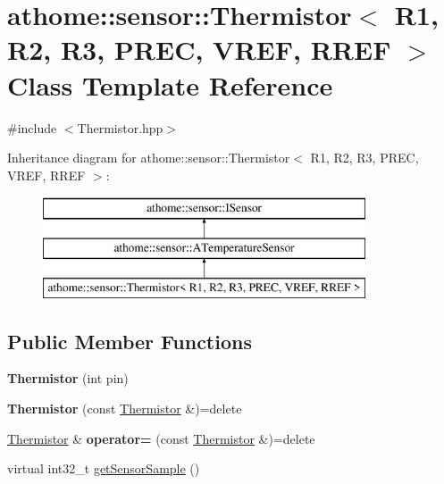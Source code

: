 \hypertarget{classathome_1_1sensor_1_1_thermistor}{}\section{athome\+:\+:sensor\+:\+:Thermistor$<$ R1, R2, R3, P\+R\+EC, V\+R\+EF, R\+R\+EF $>$ Class Template Reference}
\label{classathome_1_1sensor_1_1_thermistor}


{\ttfamily \#include $<$Thermistor.\+hpp$>$}

Inheritance diagram for athome\+:\+:sensor\+:\+:Thermistor$<$ R1, R2, R3, P\+R\+EC, V\+R\+EF, R\+R\+EF $>$\+:\begin{figure}[H]
\begin{center}
\leavevmode
\includegraphics[height=3.000000cm]{classathome_1_1sensor_1_1_thermistor}
\end{center}
\end{figure}
\subsection*{Public Member Functions}
\begin{DoxyCompactItemize}
\item 
\mbox{\label{classathome_1_1sensor_1_1_thermistor_a44767c962e57aa33ef6fd10ea3b00cf9}} 
{\bfseries Thermistor} (int pin)
\item 
\mbox{\label{classathome_1_1sensor_1_1_thermistor_a3cbfb96cd205f2ddb6fa813b4dedbafe}} 
{\bfseries Thermistor} (const \mbox{\hyperlink{classathome_1_1sensor_1_1_thermistor}{Thermistor}} \&)=delete
\item 
\mbox{\label{classathome_1_1sensor_1_1_thermistor_a7820ca124e20e1a1665a8b5c2cdce71f}} 
\mbox{\hyperlink{classathome_1_1sensor_1_1_thermistor}{Thermistor}} \& {\bfseries operator=} (const \mbox{\hyperlink{classathome_1_1sensor_1_1_thermistor}{Thermistor}} \&)=delete
\item 
virtual int32\+\_\+t \mbox{\hyperlink{classathome_1_1sensor_1_1_thermistor_abc45d8d277fb186b5d303f9e53bf73d4}{get\+Sensor\+Sample}} ()
\end{DoxyCompactItemize}
